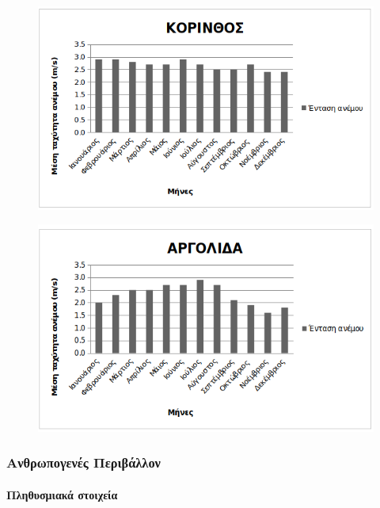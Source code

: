 \documentclass[12pt]{article}
\begin{document}
	\begin{figure} [H]
		\begin{center}
			\includegraphics [scale = 0.80] {wind2.png}
		\end{center}
	\end{figure}

	\begin{figure} [H]
		\begin{center}
			\includegraphics [scale = 0.80] {wind3.png}
		\end{center}
	\end{figure}

	\subsubsection{Ανθρωπογενές Περιβάλλον}
	
	\paragraph{Πληθυσμιακά στοιχεία}
	
\end{document}
